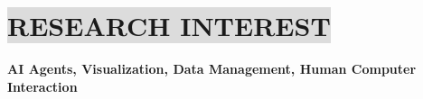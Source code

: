 \section*{
    \colorbox{gainsboro}{RESEARCH INTEREST}
}
\textbf{AI Agents, Visualization, Data Management, Human Computer Interaction}
